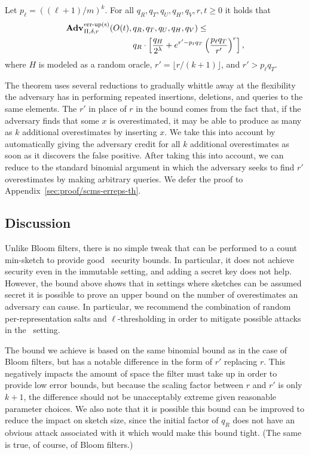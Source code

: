 \begin{theorem}\label{thm:scms-erreps-th}
Let $p_\ell = ((\ell+1)/m)^k$. For all $q_R, q_T, q_U, q_H, q_V, r, t \geq 0$
it holds that
  \begin{equation*}
  \begin{aligned}
    \Adv{\erreps}_{\Pi,\delta,r}(O(t),\,&q_R,q_T,q_U,q_H,q_V) \leq \\
     & q_R \cdot \left[\frac{q_H}{2^\lambda} + e^{r'-p_\ell q_T}\left(\frac{p_\ell q_T}{r'}\right)^r\right],
  \end{aligned}
\end{equation*}
where $H$ is modeled as a random oracle, $r' = \lfloor r/(k+1) \rfloor$, and $r'
> p_\ell q_T$.
\end{theorem}

The theorem uses several reductions to gradually whittle away at the flexibility
the adversary has in performing repeated insertions, deletions, and queries to
the same elements. The $r'$ in place of $r$ in the bound comes from the fact
that, if the adversary finds that some $x$ is overestimated, it may be able to
produce as many as $k$ additional overestimates by inserting $x$. We take this
into account by automatically giving the adversary credit for all $k$ additional
overestimates as soon as it discovers the false positive. After taking this into
account, we can reduce to the standard binomial argument in which the adversary
seeks to find $r'$ overestimates by making arbitrary queries.
%
We defer the proof to Appendix~\ref{sec:proof/scms-erreps-th}.

%  

\subsection{Discussion}

Unlike Bloom filters, there is no simple tweak that can be performed
to a count min-sketch to provide good \errep\ security bounds. In particular, it
does not achieve security even in the immutable setting, and adding a secret key
does not help.
%
However, the bound above shows that in settings where sketches can be assumed
secret it is possible to prove an upper bound on the number of overestimates an
adversary can cause. In particular, we recommend the combination of random
per-representation salts and $\ell$-thresholding in order to mitigate possible
attacks in the \erreps\ setting.

The bound we achieve is based on the same binomial bound as in the case of Bloom
filters, but has a notable difference in the form of $r'$ replacing $r$. This
negatively impacts the amount of space the filter must take up in order to
provide low error bounds, but because the scaling factor between $r$ and $r'$ is
only $k+1$, the difference should not be unacceptably extreme given reasonable
parameter choices. We also note that it is possible this bound can be improved
to reduce the impact on sketch size, since the initial factor of $q_R$ does not
have an obvious attack associated with it which would make this bound tight.
%
(The same is true, of course, of Bloom filters.)